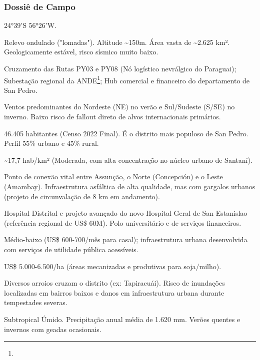 \subsubsection{Dossiê de Campo}
\begin{description}[style=nextline,leftmargin=0.5cm,font=\bfseries]
\item[Coordenadas]  24°39'S 56°26'W.
\item[Topografia]  Relevo ondulado ("lomadas"). Altitude \textasciitilde 150m. Área vasta de \textasciitilde 2.625 km². Geologicamente estável, risco sísmico muito baixo.
\item[Alvos Estratégicos]  Cruzamento das Rutas PY03 e PY08 (Nó logístico nevrálgico do Paraguai); Subestação regional da ANDE\footnote{\fineANDE}; Hub comercial e financeiro do departamento de San Pedro.
\item[Fallout]  Ventos predominantes do Nordeste (NE) no verão e Sul/\allowbreak Sudeste (S/\allowbreak SE) no inverno. Baixo risco de fallout direto de alvos internacionais primários.
\item[População]  46.405 habitantes (Censo 2022 Final). É o distrito mais populoso de San Pedro. Perfil 55\% urbano e 45\% rural.
\item[Densidade]  \textasciitilde 17,7 hab/\allowbreak km² (Moderada, com alta concentração no núcleo urbano de Santaní).
\item[Vias de Acesso]  Ponto de conexão vital entre Assunção, o Norte (Concepción) e o Leste (Amambay). Infraestrutura asfáltica de alta qualidade, mas com gargalos urbanos (projeto de circunvalação de 8 km em andamento).
\item[Serviços]  Hospital Distrital e projeto avançado do novo Hospital Geral de San Estanislao (referência regional de US\$ 60M). Polo universitário e de serviços financeiros.
\item[Custo de Vida]  Médio-baixo (US\$ 600-700/\allowbreak mês para casal); infraestrutura urbana desenvolvida com serviços de utilidade pública acessíveis.
\item[Preço da Terra]  US\$ 5.000-6.500/\allowbreak ha (áreas mecanizadas e produtivas para soja/\allowbreak milho).
\item[Hidrologia]  Diversos arroios cruzam o distrito (ex: Tapiracuái). Risco de inundações localizadas em bairros baixos e danos em infraestrutura urbana durante tempestades severas.
\item[Clima]  Subtropical Úmido. Precipitação anual média de 1.620 mm. Verões quentes e invernos com geadas ocasionais.

\end{description}
